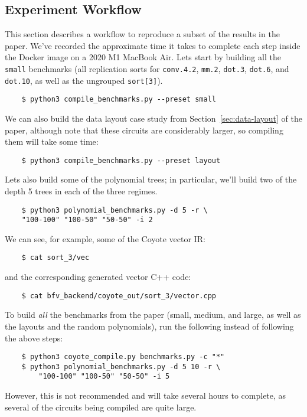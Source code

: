 \subsection{Experiment Workflow}
This section describes a workflow to reproduce a subset of the results in the paper.
We've recorded the approximate time it takes to complete each step inside the Docker image on a 2020 M1 MacBook Air.
Lets start by building all the {\tt small} benchmarks (all replication sorts for {\tt conv.4.2}, {\tt mm.2}, {\tt dot.3}, {\tt dot.6}, and {\tt dot.10}, as well as the ungrouped {\tt sort[3]}). 
\begin{verbatim}
    $ python3 compile_benchmarks.py --preset small    
\end{verbatim}
We can also build the data layout case study from Section~\ref{sec:data-layout} of the paper, although note that these circuits are considerably larger, so compiling them will take some time:
\begin{verbatim}
    $ python3 compile_benchmarks.py --preset layout    
\end{verbatim}
Lets also build some of the polynomial trees; in particular, we'll build two of the depth 5 trees in each of the three regimes.
\begin{verbatim}
    $ python3 polynomial_benchmarks.py -d 5 -r \
    "100-100" "100-50" "50-50" -i 2    
\end{verbatim}

We can see, for example, some of the Coyote vector IR:
\begin{verbatim}
    $ cat sort_3/vec    
\end{verbatim}
and the corresponding generated vector C++ code:
\begin{verbatim}
    $ cat bfv_backend/coyote_out/sort_3/vector.cpp    
\end{verbatim}

To build {\em all} the benchmarks from the paper (small, medium, and large, as well as the layouts and the random polynomials), run the following instead of following the above steps:
\begin{verbatim}
    $ python3 coyote_compile.py benchmarks.py -c "*"
    $ python3 polynomial_benchmarks.py -d 5 10 -r \
        "100-100" "100-50" "50-50" -i 5    
\end{verbatim}
However, this is not recommended and will take several hours to complete, as several of the circuits being compiled are quite large.

